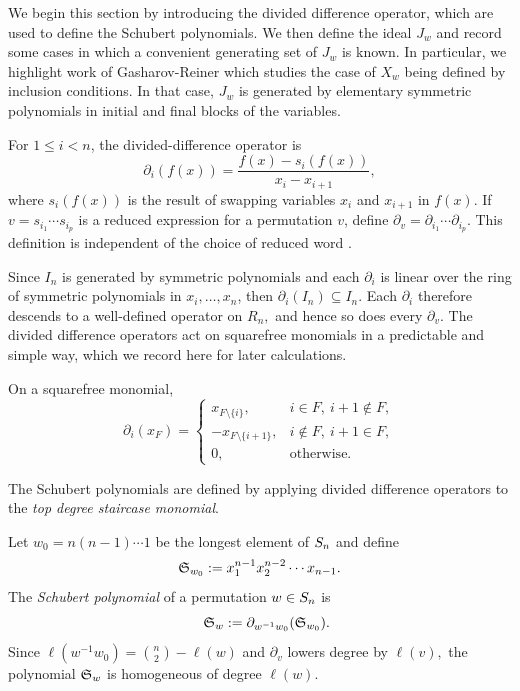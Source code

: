 We begin this section by introducing the divided difference operator, which are used to define the Schubert polynomials. We then define the ideal $J_w$ and record some cases in which a convenient generating set of $J_w$ is known. In particular, we highlight work of Gasharov-Reiner \cite{GasharovReiner} which studies the case of $X_w$ being defined by inclusion conditions. In that case, $J_w$ is generated by elementary symmetric polynomials in initial and final blocks of the variables. 


\begin{definition}
\label{def:div-diff}
For \(1\leq i<n\), the divided-difference operator is
\[
\partial_i(f(x))=\frac{f(x)-s_i(f(x))}{x_i-x_{i+1}},
\]
where $s_i(f(x))$ is the result of swapping variables $x_i$ and $x_{i+1}$ in $f(x)$. 
If $v = s_{i_1}\cdots s_{i_p}$ is a reduced expression for a permutation $v$, define $\partial_v=\partial_{i_1}\cdots\partial_{i_p}$.
This definition is independent of the choice of reduced word \cite[Chapter II, Equation (2.5)]{Macdonald}.  
\end{definition}

Since $I_n$ is generated by symmetric polynomials and each $\partial_i$ is linear over the ring of symmetric polynomials in $x_i,\ldots,x_n$, then $\partial_i(I_n)\subseteq I_n.$ 
Each $\partial_i$ therefore descends to a well-defined operator on $R_n,$ and hence so does every $\partial_v.$
The divided difference operators act on squarefree monomials in a predictable and simple way, which we record here for later calculations.

\begin{remark}
\label{rem:sqfr-mon-div-diff}    
On a squarefree monomial,
\begin{equation}
\label{eq:squarefree-dd}
 \partial_i(x_F) = 
 \begin{cases}
 x_{F\setminus\{i\}},&i\in F,\ i+1\notin F,\\
 -x_{F\setminus\{i+1\}},&i\notin F,\ i+1\in F,\\
 0,&\text{otherwise}.
 \end{cases}
\end{equation}
\end{remark}

The Schubert polynomials are defined by applying divided difference operators to the \emph{top degree staircase monomial}.

\begin{definition}
\label{def: schubert polynomials}
    Let $w_0 = n(n-1)\cdots 1$ be the longest element of $S_n$ and define
    \[
    \mathfrak{S}_{w_0} := x_1^{n-1}x_2^{n-2}\cdots x_{n-1}.
    \]
    The \emph{Schubert polynomial} of a permutation $w\in S_n$ is
    \[
    \quad \mathfrak{S}_w:=\partial_{w^{-1}w_0}(\mathfrak{S}_{w_0}).
    \]
    Since $\ell(w^{-1}w_0) = \binom{n}{2} - \ell(w)$ and $\partial_v$ lowers degree by $\ell(v),$ the polynomial $\mathfrak{S}_w$ is homogeneous of degree $\ell(w).$
\end{definition}

